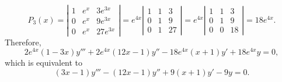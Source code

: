 \documentclass[dvips]{book}
\numberwithin{example}{section}
\numberwithin{equation}{section}
\numberwithin{theorem}{section}
\numberwithin{table}{section}
\numberwithin{figure}{section}
\begin{document}
$$
P_3(x)=
\left|\begin{array}{ccc}
1&e^x&3e^{3x}\\
0&e^x&9e^{3x}\\
0&e^x&27e^{3x}
\end{array}\right|=
e^{4x}\left|\begin{array}{ccc}
1&1&3\\
0&1&9\\
0&1&27
\end{array}\right|=
e^{4x}\left|\begin{array}{ccc}
1&1&3\\
0&1&9\\
0&0&18
\end{array}\right|=18e^{4x}.
$$
Therefore,
$$
2e^{4x}(1-3x)y'''+2e^{4x}(12x-1)y''-18e^{4x}(x+1)y'+18e^{4x}y=0,
$$
which is equivalent to
$$
(3x-1)y'''-(12x-1)y''+9(x+1)y'-9y=0.
$$
\end{document}
